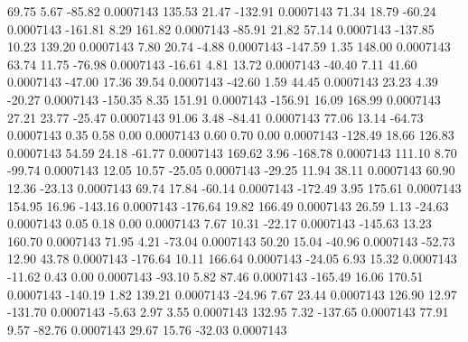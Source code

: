        69.75        5.67      -85.82     0.0007143
      135.53       21.47     -132.91     0.0007143
       71.34       18.79      -60.24     0.0007143
     -161.81        8.29      161.82     0.0007143
      -85.91       21.82       57.14     0.0007143
     -137.85       10.23      139.20     0.0007143
        7.80       20.74       -4.88     0.0007143
     -147.59        1.35      148.00     0.0007143
       63.74       11.75      -76.98     0.0007143
      -16.61        4.81       13.72     0.0007143
      -40.40        7.11       41.60     0.0007143
      -47.00       17.36       39.54     0.0007143
      -42.60        1.59       44.45     0.0007143
       23.23        4.39      -20.27     0.0007143
     -150.35        8.35      151.91     0.0007143
     -156.91       16.09      168.99     0.0007143
       27.21       23.77      -25.47     0.0007143
       91.06        3.48      -84.41     0.0007143
       77.06       13.14      -64.73     0.0007143
        0.35        0.58        0.00     0.0007143
        0.60        0.70        0.00     0.0007143
     -128.49       18.66      126.83     0.0007143
       54.59       24.18      -61.77     0.0007143
      169.62        3.96     -168.78     0.0007143
      111.10        8.70      -99.74     0.0007143
       12.05       10.57      -25.05     0.0007143
      -29.25       11.94       38.11     0.0007143
       60.90       12.36      -23.13     0.0007143
       69.74       17.84      -60.14     0.0007143
     -172.49        3.95      175.61     0.0007143
      154.95       16.96     -143.16     0.0007143
     -176.64       19.82      166.49     0.0007143
       26.59        1.13      -24.63     0.0007143
        0.05        0.18        0.00     0.0007143
        7.67       10.31      -22.17     0.0007143
     -145.63       13.23      160.70     0.0007143
       71.95        4.21      -73.04     0.0007143
       50.20       15.04      -40.96     0.0007143
      -52.73       12.90       43.78     0.0007143
     -176.64       10.11      166.64     0.0007143
      -24.05        6.93       15.32     0.0007143
      -11.62        0.43        0.00     0.0007143
      -93.10        5.82       87.46     0.0007143
     -165.49       16.06      170.51     0.0007143
     -140.19        1.82      139.21     0.0007143
      -24.96        7.67       23.44     0.0007143
      126.90       12.97     -131.70     0.0007143
       -5.63        2.97        3.55     0.0007143
      132.95        7.32     -137.65     0.0007143
       77.91        9.57      -82.76     0.0007143
       29.67       15.76      -32.03     0.0007143
